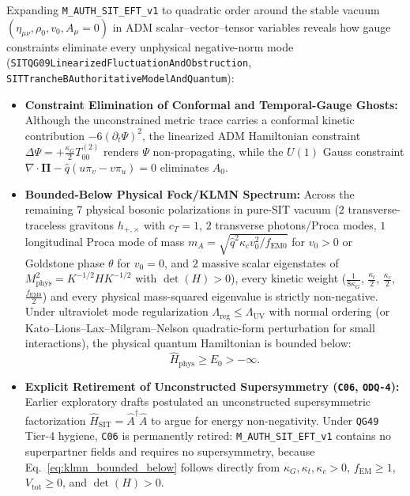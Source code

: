 Expanding \texttt{M\_AUTH\_SIT\_EFT\_v1} to quadratic order around the stable vacuum $(\eta_{\mu\nu}, \rho_0, v_0, A_\mu = 0)$ in ADM scalar--vector--tensor variables reveals how gauge constraints eliminate every unphysical negative-norm mode (\texttt{SITQG09LinearizedFluctuationAndObstruction}, \texttt{SITTrancheBAuthoritativeModelAndQuantum}):
\begin{itemize}
  \item \textbf{Constraint Elimination of Conformal and Temporal-Gauge Ghosts:} Although the unconstrained metric trace carries a conformal kinetic contribution $-6(\partial_t\Psi)^2$, the linearized ADM Hamiltonian constraint $\Delta\Psi = +\frac{\kappa_G}{2}T_{00}^{(2)}$ renders $\Psi$ non-propagating, while the $U(1)$ Gauss constraint $\nabla\cdot\mathbf{\Pi} - \hat{q}(u\pi_v - v\pi_u) = 0$ eliminates $A_0$.
  \item \textbf{Bounded-Below Physical Fock/KLMN Spectrum:} Across the remaining $7$ physical bosonic polarizations in pure-SIT vacuum ($2$ transverse-traceless gravitons $h_{+,\times}$ with $c_T = 1$, $2$ transverse photons/Proca modes, $1$ longitudinal Proca mode of mass $m_A = \sqrt{\hat{q}^2\kappa_c v_0^2 / f_{\mathrm{EM}0}}$ for $v_0 > 0$ or Goldstone phase $\theta$ for $v_0 = 0$, and $2$ massive scalar eigenstates of $M_{\mathrm{phys}}^2 = K^{-1/2} H K^{-1/2}$ with $\det(H) > 0$), every kinetic weight ($\frac{1}{8\kappa_G}$, $\frac{\kappa_t}{2}$, $\frac{\kappa_c}{2}$, $\frac{f_{\mathrm{EM}0}}{2}$) and every physical mass-squared eigenvalue is strictly non-negative. Under ultraviolet mode regularization $\Lambda_{\mathrm{reg}} \le \Lambda_{\mathrm{UV}}$ with normal ordering (or Kato--Lions--Lax--Milgram--Nelson quadratic-form perturbation for small interactions), the physical quantum Hamiltonian is bounded below:
  \begin{equation}
  \hat{H}_{\mathrm{phys}} \ge E_0 > -\infty.
  \label{eq:klmn_bounded_below}
  \end{equation}
  \item \textbf{Explicit Retirement of Unconstructed Supersymmetry (\texttt{C06}, \texttt{ODQ-4}):} Earlier exploratory drafts postulated an unconstructed supersymmetric factorization $\hat{H}_{\mathrm{SIT}} = \hat{A}^\dagger\hat{A}$ to argue for energy non-negativity. Under \texttt{QG49} Tier-4 hygiene, \texttt{C06} is permanently retired: \texttt{M\_AUTH\_SIT\_EFT\_v1} contains no superpartner fields and requires no supersymmetry, because Eq.~\eqref{eq:klmn_bounded_below} follows directly from $\kappa_G, \kappa_t, \kappa_c > 0$, $f_{\mathrm{EM}} \ge 1$, $V_{\mathrm{tot}} \ge 0$, and $\det(H) > 0$.
\end{itemize}


